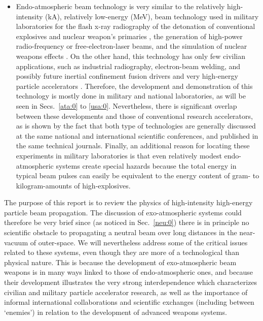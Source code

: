 \documentclass [12pt,a4paper,     ]{report} %
\begin{document}
\begin{itemize}
\item Endo-atmospheric beam technology is very similar to the relatively high-intensity (kA), relatively low-energy (MeV), beam technology used in military laboratories for the flash x-ray radiography of the detonation of conventional explosives and nuclear weapon's primaries \cite[p.81--84]{CUNNI2003-}, the generation of high-power radio-frequency or free-electron-laser beams, and the simulation of nuclear weapons effects \cite{FLEIS1975-}.  On the other hand, this technology has only few civilian applications, such as industrial radiography, electron-beam welding, and possibly future inertial confinement fusion drivers and very high-energy particle accelerators \cite{BARLE1990-}.  Therefore, the development and demonstration of this technology is mostly done in military and national laboratories, as will be seen in Secs.~\ref{ata:0} to \ref{usa:0}.  Nevertheless, there is significant overlap between these developments and those of conventional research accelerators, as is shown by the fact that both type of technologies are generally discussed at the same national and international scientific conferences, and published in the same technical journals.  Finally, an additional reason for locating these experiments in military laboratories is that even relatively modest endo-atmospheric systems create special hazards because the total energy in typical beam pulses can easily be equivalent to the energy content of gram- to kilogram-amounts of high-explosives.

\end{itemize}

The purpose of this report is to review the physics of high-intensity high-energy particle beam propagation.  The discussion of exo-atmospheric systems could therefore be very brief since (as noticed in Sec.~\ref{neu:0}) there is in principle no scientific obstacle to propagating a neutral beam over long distances in the near-vacuum of outer-space.  We will nevertheless address some of the critical issues related to these systems, even though they are more of a technological than physical nature.  This is because the development of exo-atmospheric beam weapons is in many ways linked to those of endo-atmospheric ones, and because their development illustrates the very strong interdependence which characterizes civilian and military particle accelerator research, as well as the importance of informal international collaborations and scientific exchanges (including between `enemies') in relation to the development of advanced weapons systems.
\end{document}
